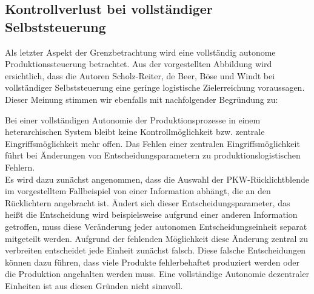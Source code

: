 \subsection{Kontrollverlust bei vollständiger Selbststeuerung}
\label{sec:GrenzenKontrollverlust}

Als letzter Aspekt der Grenzbetrachtung wird eine vollständig autonome
Produktionssteuerung betrachtet. Aus der vorgestellten Abbildung wird
ersichtlich, dass die Autoren Scholz-Reiter, de Beer, Böse und Windt bei
vollständiger Selbststeuerung eine geringe logistische Zielerreichung
voraussagen. Dieser Meinung stimmen wir ebenfalls mit nachfolgender Begründung
zu:

Bei einer vollständigen Autonomie der Produktionsprozesse in einem
heterarchischen System bleibt keine Kontrollmöglichkeit bzw. zentrale
Eingriffsmöglichkeit mehr offen. Das Fehlen einer zentralen
Eingriffsmöglichkeit führt bei Änderungen von Entscheidungsparametern zu
produktionslogistischen Fehlern. \hfill \\
Es wird dazu zunächst angenommen, dass die Auswahl der PKW-Rücklichtblende im
vorgestelltem Fallbeispiel von einer Information abhängt, die an den
Rücklichtern angebracht ist. Ändert sich dieser Entscheidungsparameter, das
heißt die Entscheidung wird beispielsweise aufgrund einer anderen Information
getroffen, muss diese Veränderung jeder autonomen Entscheidungseinheit separat
mitgeteilt werden. Aufgrund der fehlenden Möglichkeit diese Änderung zentral zu
verbreiten entscheidet jede Einheit zunächst falsch. Diese falsche
Entscheidungen können dazu führen, dass viele Produkte fehlerbehaftet
produziert werden oder die Produktion angehalten werden muss. Eine vollständige
Autonomie dezentraler Einheiten ist aus diesen Gründen nicht sinnvoll.

\clearpage